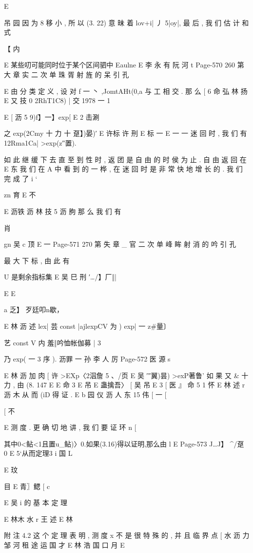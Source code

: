 {{E

吊 园
因 为 8 移 小 , 所 以 (3. 22) 意 昧 着 lov+i| 丿 5|oy|, 最 后 , 我 们 估 计
和 式

【
内

E 某些叨可能同时位于某个区间驷中 Eaulne
E 李 永 有 阮 河 t
Page-570
260 第 大 章 实 二 次 单 珠 胥 射 旌 的 呆 引 孔

E
由 分 类 定 义 , 设 对 f 一 丶 ,JomtAHt(0,a 与 工 相 交 . 那 么
[ 6 命 弘 林 扬
E 又 技
0
2RhT1C8) | 交 1978 一 1

E
[ 沥 5 9)f】一】exp[ E 2 击涮

之 exp(2Cmy 十 力 十 趸】)晏)′
E 许标 许 刑
E 标 一
E 一 一
迷 回 时 , 我 们 有
12Rma1Ca| >exp(z″置).

如 此 继 缓 下 去 直 至 到 性 时 , 返 团 是 自 由 的 时 侯 为 止 . 自 由 返 回 在
E 东
我 们 在 A 中 看 到 的 一 桦 , 在 迷 回 时 是 非 常 快 地 增 长 的 . 我 们 完 成 了
i `

zn 育
E 不

E 沥铁 沥 林 技 5 沥 朐
那 么 我 们 有

肖

gn 吴 c 顶
E 一
Page-571
270 第 失 章 _ 官 二 次 单 峰 眸 射 消 的 吟 引 孔

最 大 下 标 , 由 此 有

U 是剩余指标集 E
吴 巳 刑
′…/】厂‖|

E
E

a 乏】 歹廷叩n歇，

E 林 沥 述
lex| 芸 const |ajlexpCV 为 ) exp| 一 z#量〕

艺 const V 内 羞‖吟恤帐伽募 |
3

乃 exp( 一 3 序 ).
沥罪 一 孙 李 人 厉
Page-572
医 源 s

E 林 沥 加 肉
[ 许
>EXp〈2泅詹 5 、/页 E 吴 ′″翼)昙) >exP著鲁'
如 果 又 & 十 力 , 由 (8. 147
E
E 命 3 E 吊
E 蛊擒吾〉 [ 吴 吊
E
3
[
医
』 命 5 1 怀
E 林 述 r 沥 木
从 而 (iD 得 证 .
E
b 园 仪 沥 人 东 15
伟
[ 一
[

[ 不

E
测 度 . 更 确 切 地 讲 , 我 们 要 证 环
n [

其中0<鲇<1且置u_鲇)〉0.如果(3.16)得以证明,那么由
l
E
Page-573
J…J】 ^/趸 0
E 5`从而定理3 i 国 L

E
玟

目
E 青〗鳃 [
c

E 吴 i
的 基 本 定 理

E 林木 水
r 王 述
E 林

附 注 4.2 这 个 定 理 表 明 , 测 度 x 不 是 很 特 殊 的 , 并 且 临 界 点
[ 水 沥 力 邹 河 租 途 运
国
才
E 林 浩 国 口 月
E

}}
